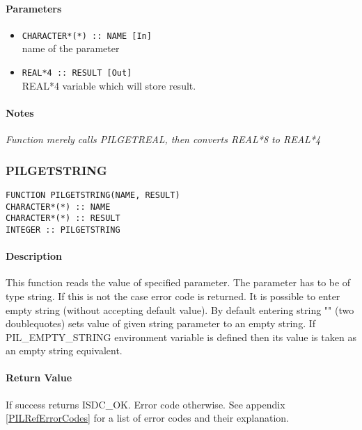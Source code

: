 \paragraph{Parameters}
\begin{itemize}
\item
{\tt CHARACTER*(*) :: NAME [In] } \\
name of the parameter 
\item
{\tt REAL*4 :: RESULT [Out] } \\
REAL*4 variable which will store result.
\end{itemize}

\paragraph{Notes\\}
{\it
Function merely calls PILGETREAL, then converts REAL*8 to REAL*4
}



\subsubsection{PILGETSTRING}

\begin{verbatim}
FUNCTION PILGETSTRING(NAME, RESULT) 
CHARACTER*(*) :: NAME 
CHARACTER*(*) :: RESULT 
INTEGER :: PILGETSTRING
\end{verbatim}

\paragraph{Description\\}
This function reads the value of specified parameter. The parameter has to
be of type string. If this is not the case error code is returned. 
It is possible to enter empty string (without accepting default value).
By default entering string "" (two doublequotes) sets value of given string
parameter to an empty string. If PIL\_EMPTY\_STRING environment variable
is defined then its value is taken as an empty string equivalent.


\paragraph{Return Value\\}
If success returns ISDC\_OK. Error code otherwise. See appendix \ref{PILRefErrorCodes}
for a list of error codes and their explanation.

